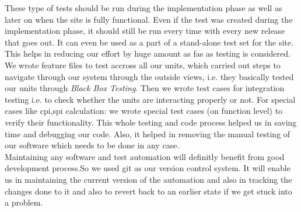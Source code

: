 \documentclass[letterpaper,12pt]{article}
\begin{document}
These type of tests should be run during the implementation phase as well as later on when the site is fully functional. Even if the test was created during the implementation phase, it should still be run every time with every new release that goes out. It can even be used as a part of a stand-alone test set for the site. This helps in reducing our effort by huge amount as fas as testing is considered. We wrote feature files to test accross all our units, which carried out steps to navigate through our system through the outside views, i.e. they basically tested our units through \emph{Black Box Testing}. Then we wrote test cases for integration testing i.e. to check whether the units are interacting properly or not. For special cases like cpi,spi calculation: we wrote special test cases (on function level) to verify their functionality. This whole testing and code process helped us in saving time and debugging our code. Also, it helped in removing the manual testing of our software which needs to be done in any case.\\
Maintaining any software and test automation will definitly benefit from good development process.So we used git as our version control system. It will enable us in maintaining the current version of the automation and also in tracking the changes done to it and also to revert back to an earlier state if we get stuck into a problem.
\end{document}
